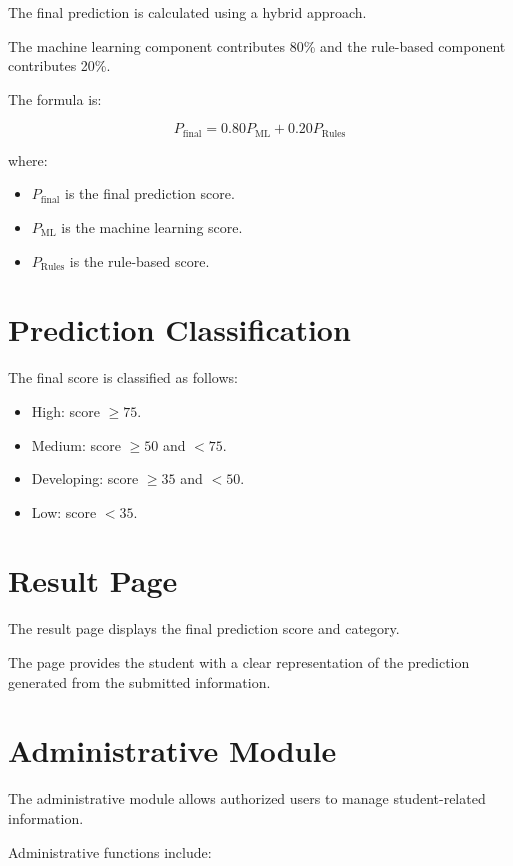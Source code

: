 \documentclass[12pt,a4paper]{report}
\begin{document}
The final prediction is calculated using a hybrid approach.

The machine learning component contributes 80\% and the
rule-based component contributes 20\%.

The formula is:

\[
P_{\text{final}} =
0.80P_{\text{ML}} +
0.20P_{\text{Rules}}
\]

where:

\begin{itemize}
    \item $P_{\text{final}}$ is the final prediction score.
    \item $P_{\text{ML}}$ is the machine learning score.
    \item $P_{\text{Rules}}$ is the rule-based score.
\end{itemize}

\section{Prediction Classification}

The final score is classified as follows:

\begin{itemize}
    \item High: score $\geq 75$.
    \item Medium: score $\geq 50$ and $<75$.
    \item Developing: score $\geq 35$ and $<50$.
    \item Low: score $<35$.
\end{itemize}

\section{Result Page}

The result page displays the final prediction score and category.

The page provides the student with a clear representation of the
prediction generated from the submitted information.

\section{Administrative Module}

The administrative module allows authorized users to manage
student-related information.

Administrative functions include:
\end{document}
